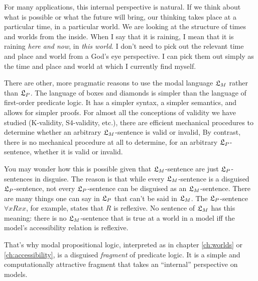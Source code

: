 For many applications, this internal perspective is natural. If we think
about what is possible or  what the future will bring, our thinking takes
place at a particular time, in a particular world. We are looking at the
structure of times and worlds from the inside. When I say that it is raining, I
mean that it is raining \emph{here and now}, in \emph{this world}. I don't need
to pick out the relevant time and place and world from a God's eye perspective.
I can pick them out simply as the time and place and world at which I currently
find myself.

There are other, more pragmatic reasons to use the modal language $\mathfrak{L}_M$ rather
than $\mathfrak{L}_P$. The language of boxes and diamonds is simpler than the language of
first-order predicate logic. It has a simpler syntax, a simpler semantics, and
allows for simpler proofs. For almost all the conceptions of validity we have
studied (K-validity, S4-validity, etc.), there are efficient mechanical
procedures to determine whether an arbitrary $\mathfrak{L}_M$-sentence is valid or
invalid, By contrast, there is no mechanical procedure at all to determine, for
an arbitrary $\mathfrak{L}_P$-sentence, whether it is valid or invalid.

You may wonder how this is possible given that $\mathfrak{L}_M$-sentence are just
$\mathfrak{L}_P$-sentences in disguise. The reason is that while every $\mathfrak{L}_M$-sentence is
a disguised $\mathfrak{L}_P$-sentence, not every $\mathfrak{L}_P$-sentence can be disguised as an
$\mathfrak{L}_M$-sentence. There are many things one can say in $\mathfrak{L}_P$ that can't be said
in $\mathfrak{L}_M$. The $\mathfrak{L}_{P}$-sentence $\forall x Rxx$, for example, states that $R$
is reflexive. No sentence of $\mathfrak{L}_M$ has this meaning: there is no
$\mathfrak{L}_{M}$-sentence that is true at a world in a model iff the model's
accessibility relation is reflexive.

That's why modal propositional logic, interpreted as in chapter \ref{ch:worlds}
or \ref{ch:accessibility}, is a disguised \emph{fragment} of predicate logic. It
is a simple and computationally attractive fragment that takes an ``internal''
perspective on models.


